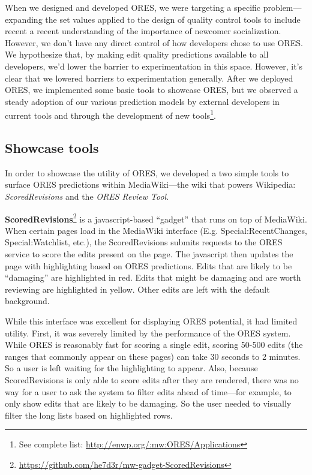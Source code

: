 When we designed and developed ORES, we were targeting a specific problem---expanding the set values applied to the design of quality control tools to include recent a recent understanding of the importance of newcomer socialization.  However, we don't have any direct control of how developers chose to use ORES.  We hypothesize that, by making edit quality predictions available to all developers, we'd lower the barrier to experimentation in this space.  However, it's clear that we lowered barriers to experimentation generally.  After we deployed ORES, we implemented some basic tools to showcase ORES, but we observed a steady adoption of our various prediction models by external developers in current tools and through the development of new tools\footnote{See complete list: \url{http://enwp.org/:mw:ORES/Applications}}.

\subsection{Showcase tools}
In order to showcase the utility of ORES, we developed a two simple tools to surface ORES predictions within MediaWiki---the wiki that powers Wikipedia: \emph{ScoredRevisions} and the \emph{ORES Review Tool}.

\textbf{ScoredRevisions}\footnote{\url{https://github.com/he7d3r/mw-gadget-ScoredRevisions}} is a javascript-based ``gadget'' that runs on top of MediaWiki.  When certain pages load in the MediaWiki interface (E.g. Special:RecentChanges, Special:Watchlist, etc.), the ScoredRevisions submits requests to the ORES service to score the edits present on the page.  The javascript then updates the page with highlighting based on ORES predictions.  Edits that are likely to be ``damaging'' are highlighted in red.  Edits that might be damaging and are worth reviewing are highlighted in yellow.  Other edits are left with the default background.

While this interface was excellent for displaying ORES potential, it had limited utility.  First, it was severely limited by the performance of the ORES system.  While ORES is reasonably fast for scoring a single edit, scoring 50-500 edits (the ranges that commonly appear on these pages) can take 30 seconds to 2 minutes.  So a user is left waiting for the highlighting to appear.  Also, because ScoredRevisions is only able to score edits after they are rendered, there was no way for a user to ask the system to filter edits ahead of time---for example, to only show edits that are likely to be damaging.  So the user needed to visually filter the long lists based on highlighted rows.

